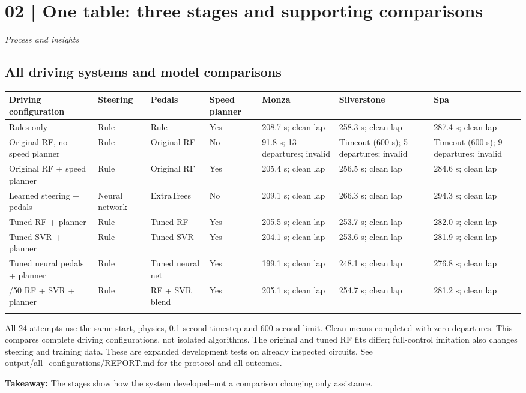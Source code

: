 \documentclass[10pt,a4paper]{article}
\newcommand{\takeaway}[1]{\begin{tcolorbox}[colback=paperblue,colframe=paperblue,boxrule=0pt]#1\end{tcolorbox}}
\begin{document}
\section*{02 | One table: three stages and supporting comparisons}
{\small\textit{Process and insights}}
\begin{landscape}\section*{All driving systems and model comparisons}
\small\begin{tabularx}{\linewidth}{p{27mm}p{32mm}p{25mm}Xp{22mm}p{22mm}p{22mm}}\toprule
Driving configuration & Steering & Pedals & Speed planner & Monza & Silverstone & Spa\\\midrule
Rules only & Rule & Rule & Yes & 208.7 s; clean lap & 258.3 s; clean lap & 287.4 s; clean lap\\\addlinespace
Original RF, no speed planner & Rule & Original RF & No & 91.8 s; 13 departures; invalid & Timeout (600 s); 5 departures; invalid & Timeout (600 s); 9 departures; invalid\\\addlinespace
Original RF + speed planner & Rule & Original RF & Yes & 205.4 s; clean lap & 256.5 s; clean lap & 284.6 s; clean lap\\\addlinespace
Learned steering + pedals & Neural network & ExtraTrees & No & 209.1 s; clean lap & 266.3 s; clean lap & 294.3 s; clean lap\\\addlinespace
Tuned RF + planner & Rule & Tuned RF & Yes & 205.5 s; clean lap & 253.7 s; clean lap & 282.0 s; clean lap\\\addlinespace
Tuned SVR + planner & Rule & Tuned SVR & Yes & 204.1 s; clean lap & 253.6 s; clean lap & 281.9 s; clean lap\\\addlinespace
Tuned neural pedals + planner & Rule & Tuned neural net & Yes & 199.1 s; clean lap & 248.1 s; clean lap & 276.8 s; clean lap\\\addlinespace
50/50 RF + SVR + planner & Rule & RF + SVR blend & Yes & 205.1 s; clean lap & 254.7 s; clean lap & 281.2 s; clean lap\\\addlinespace
\bottomrule\end{tabularx}
All 24 attempts use the same start, physics, 0.1-second timestep and 600-second limit. Clean means completed with zero departures. This compares complete driving configurations, not isolated algorithms. The original and tuned RF fits differ; full-control imitation also changes steering and training data. These are expanded development tests on already inspected circuits. See output/all\_configurations/REPORT.md for the protocol and all outcomes.
\end{landscape}
\takeaway{\textbf{Takeaway:} The stages show how the system developed--not a comparison changing only assistance.}
\clearpage
\end{document}
